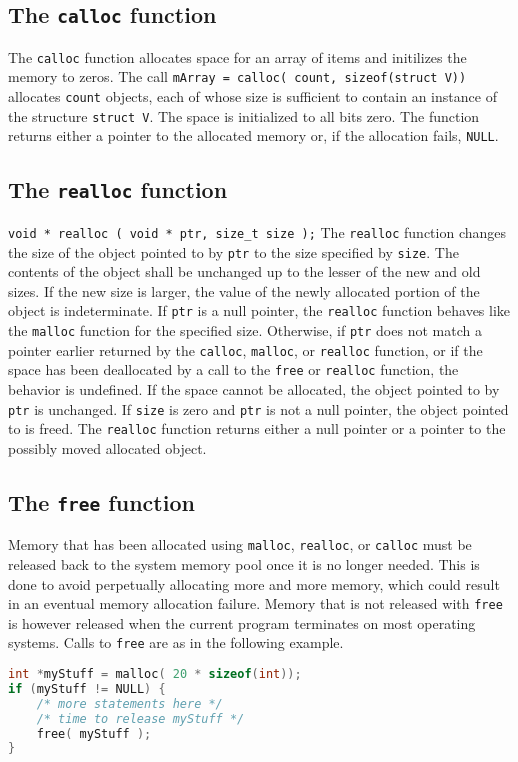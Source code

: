 \subsection{The \texttt{calloc} function}
The \texttt{calloc} function allocates space for an array of items and
initilizes the memory to zeros. The call \texttt{mArray = calloc( count,
sizeof(struct V))} allocates \texttt{count} objects, each of whose size is
sufficient to contain an instance of the structure \texttt{struct V}. The space
is initialized to all bits zero. The function returns either a pointer to the
allocated memory or, if the allocation fails, \texttt{NULL}.

\subsection{The \texttt{realloc} function}
\texttt{void * realloc ( void * ptr, size\_t size );}
The \texttt{realloc} function changes the size of the object pointed to by
\texttt{ptr} to the size specified by \texttt{size}. The contents of the object
shall be unchanged up to the lesser of the new and old sizes. If the new size
is larger, the value of the newly allocated portion of the object is
indeterminate. If \texttt{ptr} is a null pointer, the \texttt{realloc} function
behaves like the \texttt{malloc} function for the specified size. Otherwise, if
\texttt{ptr} does not match a pointer earlier returned by the \texttt{calloc},
\texttt{malloc}, or \texttt{realloc} function, or if the space has been
deallocated by a call to the \texttt{free} or \texttt{realloc} function, the
behavior is undefined. If the space cannot be allocated, the object pointed to
by \texttt{ptr} is unchanged. If \texttt{size} is zero and \texttt{ptr} is not
a null pointer, the object pointed to is freed. The \texttt{realloc} function
returns either a null pointer or a pointer to the possibly moved allocated
object.

\subsection{The \texttt{free} function}
Memory that has been allocated using \texttt{malloc}, \texttt{realloc}, or
\texttt{calloc} must be released back to the system memory pool once it is no
longer needed. This is done to avoid perpetually allocating more and more
memory, which could result in an eventual memory allocation failure. Memory
that is not released with \texttt{free} is however released when the current
program terminates on most operating systems. Calls to \texttt{free} are as in
the following example.
\lstset{basicstyle=\scriptsize, numbers=left, captionpos=b, tabsize=4}
\begin{lstlisting}[caption=Section \thesection listing \arabic{memcnt},language={C},
breaklines=true,xleftmargin=15pt,label=lst:section\thesection listing\arabic{memcnt}]
int *myStuff = malloc( 20 * sizeof(int)); 
if (myStuff != NULL) {
	/* more statements here */
	/* time to release myStuff */
	free( myStuff );
}
\end{lstlisting}

